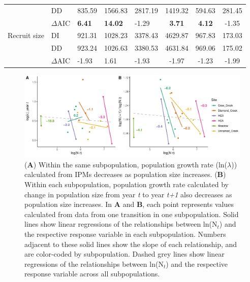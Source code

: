 \documentclass[12pt, letterpaper]{article}
\begin{document}
\begin{table}[h!]
\begin{spacing}{1.2}
\begin{tabular}{l l p{} p{} p{}ccc}
& DD &                                   835.59 &  1566.83 & 2817.19 & 1419.32 & 594.63 & 281.45 \\
 & $\Delta$AIC &                         \textbf{6.41} &    \textbf{14.02} &   -1.29 &   \textbf{3.71} &    \textbf{4.12} &   -1.35 \\ 
\rowcolor[gray]{.95} Recruit size & DI & 921.31 &  1028.23 & 3378.43 & 4629.87 & 967.83 & 173.03 \\
\rowcolor[gray]{.95} & DD &              923.24 &  1026.63 & 3380.53 & 4631.84 & 969.06 & 175.02 \\ 
\rowcolor[gray]{.95} & $\Delta$AIC &     -1.93 &   1.61 &   -1.93 &   -1.97 &   -1.23 &  -1.99 \\
\hline
\end{tabular}
\end{spacing}
\end{table}

\begin{figure}[h!]
  \centering
  \includegraphics[width=\textwidth]{figures/densityDependenceFigure.pdf}
  \caption{\internallinenumbers (\textbf{A}) Within the same subpopulation, population growth rate (ln($\lambda$)) calculated from IPMs decreases as population size increases. (\textbf{B}) Within each subpopulation, population growth rate calculated by change in population size from year \textit{t} to year \textit{t+1} also decreases as population size increases. In \textbf{A} and \textbf{B}, each point represents values calculated from data from one transition in one subpopulation. Solid lines show linear regressions of the relationships between ln(N$_t$) and the respective response variable in each subpopulation. Numbers adjacent to these solid lines show the slope of each relationship, and are color-coded by subpopulation. Dashed grey lines show linear regressions of the relationships between ln(N$_t$) and the respective response variable across all subpopulations.}
  \label{fig:DDFig}
\end{figure} 
\end{document}
